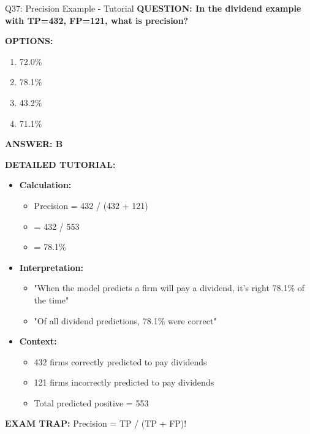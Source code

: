 \documentclass[8pt]{beamer}
\begin{document}
	\begin{frame}{Q37: Precision Example - Tutorial}
		\fontsize{6.5}{7.5}\selectfont
		\textbf{QUESTION: In the dividend example with TP=432, FP=121, what is precision?}
		
		\vspace{0.1cm}
		\textbf{OPTIONS:}
		\begin{enumerate}
			\item 72.0\%
			\item 78.1\%
			\item 43.2\%
			\item 71.1\%
		\end{enumerate}
		
		\vspace{0.1cm}
		\textcolor{myblue}{\textbf{ANSWER: B}}
		
		\vspace{0.1cm}
		\textbf{DETAILED TUTORIAL:}
		\begin{itemize}
			\item \textbf{Calculation:}
			\begin{itemize}
				\item Precision = 432 / (432 + 121)
				\item = 432 / 553
				\item = 78.1\%
			\end{itemize}
			\item \textbf{Interpretation:}
			\begin{itemize}
				\item "When the model predicts a firm will pay a dividend, it's right 78.1\% of the time"
				\item "Of all dividend predictions, 78.1\% were correct"
			\end{itemize}
			\item \textbf{Context:}
			\begin{itemize}
				\item 432 firms correctly predicted to pay dividends
				\item 121 firms incorrectly predicted to pay dividends
				\item Total predicted positive = 553
			\end{itemize}
		\end{itemize}
		
		\textcolor{myred}{\textbf{EXAM TRAP:}} Precision = \textcolor{myblue}{TP / (TP + FP)}!
	\end{frame}
	
\end{document}
